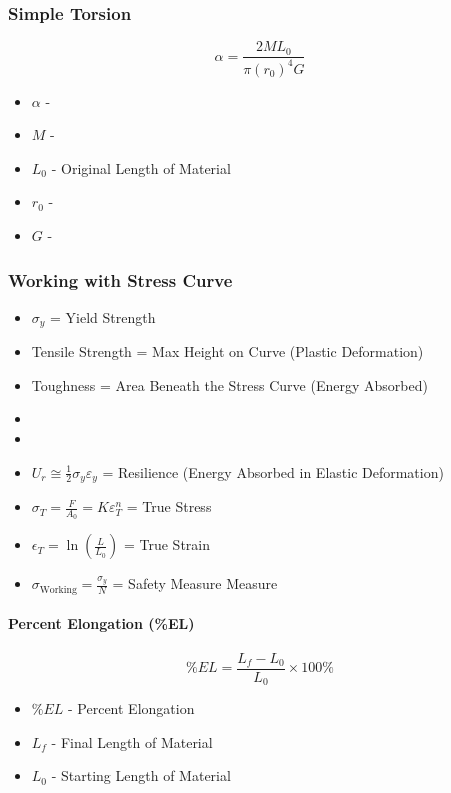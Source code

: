 		\subsubsection{Simple Torsion} \label{subsubsec:Simple Torsion}
			\begin{equation} \label{eq:Simple Torsion}
				\alpha = \frac{2 M L_{0}}{\pi \left( r_{0} \right)^{4} G}
			\end{equation}
			\begin{itemize}[noitemsep]
				\item $\alpha$ - 
				\item $M$ - 
				\item $L_{0}$ - Original Length of Material
				\item $r_{0}$ - 
				\item $G$ - 
			\end{itemize}
			
		\subsubsection{Working with Stress Curve}
			\begin{itemize}[noitemsep]
				\item $\sigma_{y}$ = Yield Strength
				\item Tensile Strength = Max Height on Curve (Plastic Deformation)
				\item Toughness = Area Beneath the Stress Curve (Energy Absorbed)
				\item {}
				\item {}
				\item $U_{r} \cong \frac{1}{2} \sigma_{y} \varepsilon_{y}$ = Resilience (Energy Absorbed in Elastic Deformation)
				\item $\sigma_{T} = \frac{F}{A_{0}} = K \varepsilon_{T}^{n}$ = True Stress
				\item $\epsilon_{T} = \ln \left( \frac{L}{L_{0}} \right)$ = True Strain
				\item $\sigma_{\text{Working}} = \frac{\sigma_{y}}{N}$ = Safety Measure Measure
			\end{itemize}
			
			\paragraph{Percent Elongation (\%EL)} \label{par:Percent Elongation}
				\begin{equation} \label{eq:Percent Elongation}
					\%EL = \frac{L_{f} - L_{0}}{L_{0}} \times 100\%
				\end{equation}
				\begin{itemize}[noitemsep]
					\item $\%EL$ - Percent Elongation
					\item $L_{f}$ - Final Length of Material
					\item $L_{0}$ - Starting Length of Material
				\end{itemize}
			
